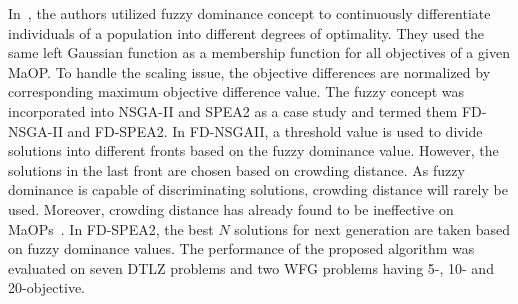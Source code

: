 \documentclass[review]{elsarticle}
\begin{document}
In~\citep{he2014fuzzy,he2012new}, the authors utilized fuzzy dominance concept to continuously differentiate individuals of a population into different degrees of optimality. They used  the same left Gaussian function as a membership function for all objectives of a given MaOP. 
To handle the scaling issue, the objective differences are normalized by corresponding maximum objective difference value. The fuzzy concept was incorporated into NSGA-II and SPEA2 as a case study and termed them  FD-NSGA-II and FD-SPEA2. In FD-NSGAII, a threshold value is used to divide solutions into different fronts based on the fuzzy dominance value. However, the solutions in the last front are chosen based on crowding distance. As fuzzy dominance is capable of discriminating solutions, crowding distance will rarely be used. 
Moreover, crowding distance has already found to be ineffective on MaOPs~\citep{purshouse2007evolutionary,deb2014evolutionary,thetadominance7080938}.
In FD-SPEA2, the best $N$ solutions for next generation are taken based on fuzzy dominance values.
The performance of the proposed algorithm was evaluated on seven DTLZ problems and two WFG problems having 5-, 10- and 20-objective.


\end{document}
